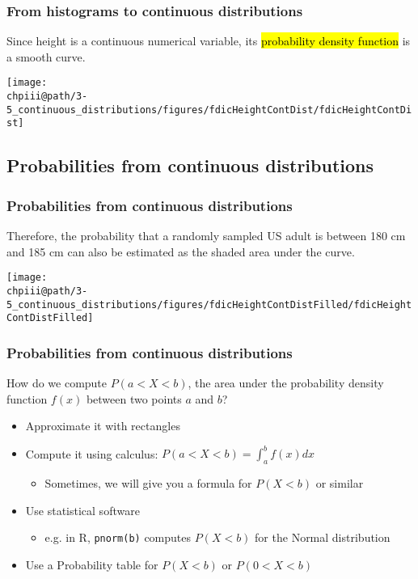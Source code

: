 \documentclass[slidestop,compress,mathserif]{beamer}
\makeatletter
\def\chpiii@path{../../Chp 3}
\makeatother
\begin{document}
\begin{frame}
\frametitle{From histograms to continuous distributions}

Since height is a continuous numerical variable, its \hl{probability density function} is a smooth curve.

\begin{center}
\texttt{[image: \\chpiii@path/3-5\_continuous\_distributions/figures/fdicHeightContDist/fdicHeightContDist]}
\end{center}

\end{frame}


\subsection{Probabilities from continuous distributions}

\begin{frame}
\frametitle{Probabilities from continuous distributions}

Therefore, the probability that a randomly sampled US adult is between 180 cm and 185 cm can also be estimated as the shaded area under the curve.

\begin{center}
\texttt{[image: \\chpiii@path/3-5\_continuous\_distributions/figures/fdicHeightContDistFilled/fdicHeightContDistFilled]}
\end{center}


\end{frame}


\begin{frame}
\frametitle{Probabilities from continuous distributions}

How do we compute $P(a<X<b)$, the area under the probability density function $f(x)$ between two points $a$ and $b$?
\begin{itemize}
  \item Approximate it with rectangles
  \item Compute it using calculus: $P(a<X<b) = \int_a^b f(x) dx$
  \begin{itemize}
    \item Sometimes, we will give you a formula for $P(X<b)$ or similar
  \end{itemize}
  \item Use statistical software 
  \begin{itemize}
    \item e.g. in R, \texttt{pnorm(b)} computes $P(X<b)$ for the Normal distribution
  \end{itemize}
  \item Use a Probability table for $P(X<b)$ or $P(0<X<b)$
\end{itemize}

\end{frame}
\end{document}

